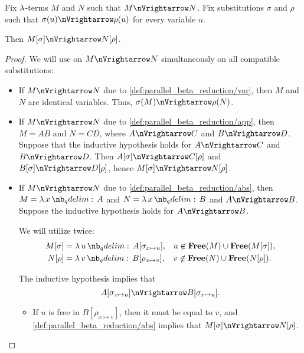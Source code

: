 \begin{proposition}\label{thm:substitution_on_parallel_reduction}
  Fix \( \mathrm{\lambda} \)-terms \( M \) and \( N \) such that \( M \pred N \). Fix substitutions \( \sigma \) and \( \rho \) such that \( \sigma(u) \pred \rho(u) \) for every variable \( u \).

  Then \( M[\sigma] \pred N[\rho] \).
\end{proposition}
\begin{proof}
  We will use  on \( M \pred N \) simultaneously on all compatible substitutions:
  \begin{itemize}
    \item If \( M \pred N \) due to \ref{def:parallel_beta_reduction/var}, then \( M \) and \( N \) are identical variables. Thus, \( \sigma(M) \pred \rho(N) \).

    \item If \( M \pred N \) due to \ref{def:parallel_beta_reduction/app}, then \( M = AB \) and \( N = CD \), where \( A \pred C \) and \( B \pred D \). Suppose that the inductive hypothesis holds for \( A \pred C \) and \( B \pred D \). Then \( A[\sigma] \pred C[\rho] \) and \( B[\sigma] \pred D[\rho] \), hence \( M[\sigma] \pred N[\rho] \).

    \item If \( M \pred N \) due to \ref{def:parallel_beta_reduction/abs}, then \( M = \qabs x A \) and \( N = \qabs x B \) and \( A \pred B \). Suppose the inductive hypothesis holds for \( A \pred B \).

    We will utilize  twice:
    \begin{align*}
      M[\sigma] &= \qabs u A[\sigma_{x \mapsto u}], &&u \not\in \op*{Free}(M) \cup \op*{Free}(M[\sigma]), \\
      N[\rho]   &= \qabs v B[\rho_{x \mapsto v}],   &&v \not\in \op*{Free}(N) \cup \op*{Free}(N[\rho]).
    \end{align*}

    The inductive hypothesis implies that
    \begin{equation*}
      A[\sigma_{x \mapsto u}] \pred B[\sigma_{x \mapsto u}].
    \end{equation*}

    \begin{itemize}
      \item If \( u \) is free in \( B[\rho_{x \mapsto v}] \), then it must be equal to \( v \), and \ref{def:parallel_beta_reduction/abs} implies that \( M[\sigma] \pred N[\rho] \).


\end{itemize}
\end{itemize}
\end{proof}
